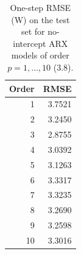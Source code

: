 \begin{table}[ht]
\centering
\caption{One-step RMSE (W) on the test set for no-intercept ARX models of order $p = 1, \ldots, 10$ (3.8).} 
\label{tab:rmse}
\begin{tabular}{rr}
  \toprule
Order & RMSE \\ 
  \midrule
1 & 3.7521 \\ 
  2 & 3.2450 \\ 
  3 & 2.8755 \\ 
  4 & 3.0392 \\ 
  5 & 3.1263 \\ 
  6 & 3.3317 \\ 
  7 & 3.3235 \\ 
  8 & 3.2690 \\ 
  9 & 3.2598 \\ 
  10 & 3.3016 \\ 
   \bottomrule
\end{tabular}
\end{table}
